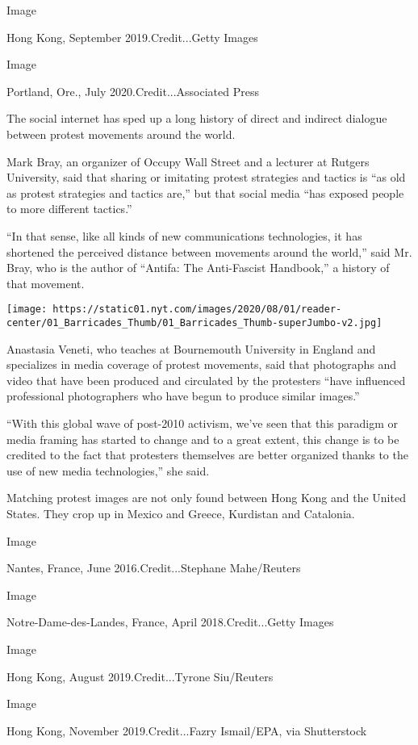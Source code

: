 Image

Hong Kong, September 2019.Credit...Getty Images

Image

Portland, Ore., July 2020.Credit...Associated Press

The social internet has sped up a long history of direct and indirect
dialogue between protest movements around the world.

Mark Bray, an organizer of Occupy Wall Street and a lecturer at Rutgers
University, said that sharing or imitating protest strategies and
tactics is ``as old as protest strategies and tactics are,'' but that
social media ``has exposed people to more different tactics.''

``In that sense, like all kinds of new communications technologies, it
has shortened the perceived distance between movements around the
world,'' said Mr. Bray, who is the author of ``Antifa: The Anti-Fascist
Handbook,'' a history of that movement.

\texttt{[image: https://static01.nyt.com/images/2020/08/01/reader-center/01\_Barricades\_Thumb/01\_Barricades\_Thumb-superJumbo-v2.jpg]}

Anastasia Veneti, who teaches at Bournemouth University in England and
specializes in media coverage of protest movements, said that
photographs and video that have been produced and circulated by the
protesters ``have influenced professional photographers who have begun
to produce similar images.''

``With this global wave of post-2010 activism, we've seen that this
paradigm or media framing has started to change and to a great extent,
this change is to be credited to the fact that protesters themselves are
better organized thanks to the use of new media technologies,'' she
said.

Matching protest images are not only found between Hong Kong and the
United States. They crop up in Mexico and Greece, Kurdistan and
Catalonia.

Image

Nantes, France, June 2016.Credit...Stephane Mahe/Reuters

Image

Notre-Dame-des-Landes, France, April 2018.Credit...Getty Images

Image

Hong Kong, August 2019.Credit...Tyrone Siu/Reuters

Image

Hong Kong, November 2019.Credit...Fazry Ismail/EPA, via Shutterstock

